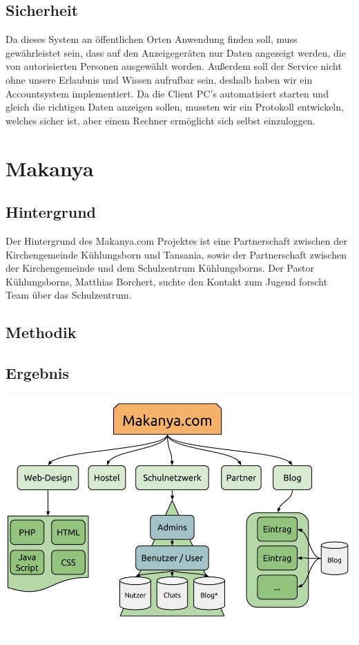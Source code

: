 \documentclass[a4paper,oneside,12pt,titlepage]{article}
\newcommand{\jf}{Jugend forscht }
\begin{document}
\subsection{Sicherheit} %
Da dieses System an öffentlichen Orten Anwendung finden soll, muss gewährleistet sein, dass auf den Anzeigegeräten nur Daten angezeigt werden, die von autorisierten Personen ausgewählt worden. Außerdem soll der Service nicht ohne unsere Erlaubnis und Wissen aufrufbar sein, deshalb haben wir ein Accountsystem implementiert. Da die Client PC's automatisiert starten und gleich die richtigen Daten anzeigen sollen, mussten wir ein Protokoll entwickeln, welches sicher ist, aber einem Rechner ermöglicht sich selbst einzuloggen.

\section{Makanya}

\subsection{Hintergrund} %
Der Hintergrund des Makanya.com Projektes ist eine Partnerschaft zwischen der Kirchengemeinde Kühlungsborn und Tansania, sowie der Partnerschaft zwischen der Kirchengemeinde und dem Schulzentrum Kühlungsborns. Der Pastor Kühlungsborns, Matthias Borchert, suchte den Kontakt zum \jf Team über das Schulzentrum.

\subsection{Methodik} %
\subsection{Ergebnis} %
\includegraphics[width=\linewidth]{imgs/makanyaOverview.png}\\
\end{document}
